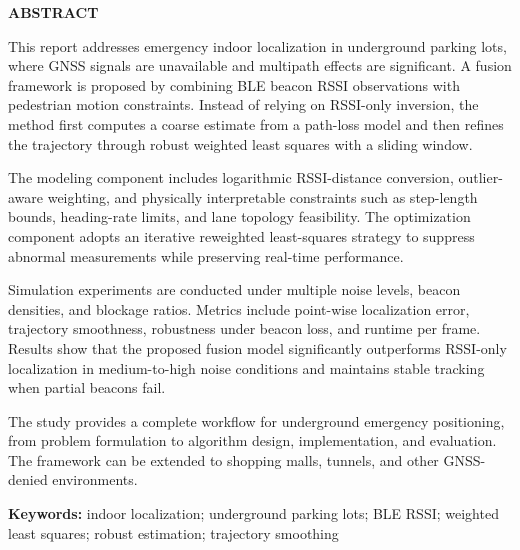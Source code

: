 \thispagestyle{plain}
{}
\centerline{\bfseries ABSTRACT}

\linespread{1.4}\bigskip

This report addresses emergency indoor localization in underground parking lots, where GNSS signals are unavailable and multipath effects are significant. A fusion framework is proposed by combining BLE beacon RSSI observations with pedestrian motion constraints. Instead of relying on RSSI-only inversion, the method first computes a coarse estimate from a path-loss model and then refines the trajectory through robust weighted least squares with a sliding window.

The modeling component includes logarithmic RSSI-distance conversion, outlier-aware weighting, and physically interpretable constraints such as step-length bounds, heading-rate limits, and lane topology feasibility. The optimization component adopts an iterative reweighted least-squares strategy to suppress abnormal measurements while preserving real-time performance.

Simulation experiments are conducted under multiple noise levels, beacon densities, and blockage ratios. Metrics include point-wise localization error, trajectory smoothness, robustness under beacon loss, and runtime per frame. Results show that the proposed fusion model significantly outperforms RSSI-only localization in medium-to-high noise conditions and maintains stable tracking when partial beacons fail.

The study provides a complete workflow for underground emergency positioning, from problem formulation to algorithm design, implementation, and evaluation. The framework can be extended to shopping malls, tunnels, and other GNSS-denied environments.

\bigskip
\noindent\textbf{ Keywords:}
indoor localization; underground parking lots; BLE RSSI; weighted least squares; robust estimation; trajectory smoothing
